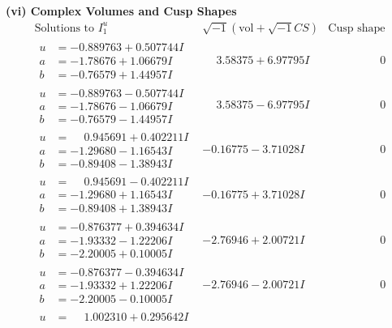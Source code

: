 \documentclass[1p]{elsarticle_modified}
\theoremstyle{definition}
\newcommand{\I}{\sqrt{-1}}
\begin{document}
\newpage\flushleft \textbf{(vi) Complex Volumes and Cusp Shapes}
$$\begin{array}{c|c|c}  
\text{Solutions to }I^u_{1}& \I (\text{vol} + \sqrt{-1}CS) & \text{Cusp shape}\\
 \hline 
\begin{aligned}
u &= -0.889763 + 0.507744 I \\
a &= -1.78676 + 1.06679 I \\
b &= -0.76579 + 1.44957 I\end{aligned}
 & \phantom{-}3.58375 + 6.97795 I & \phantom{-0.000000 } 0 \\ \hline\begin{aligned}
u &= -0.889763 - 0.507744 I \\
a &= -1.78676 - 1.06679 I \\
b &= -0.76579 - 1.44957 I\end{aligned}
 & \phantom{-}3.58375 - 6.97795 I & \phantom{-0.000000 } 0 \\ \hline\begin{aligned}
u &= \phantom{-}0.945691 + 0.402211 I \\
a &= -1.29680 - 1.16543 I \\
b &= -0.89408 - 1.38943 I\end{aligned}
 & -0.16775 - 3.71028 I & \phantom{-0.000000 } 0 \\ \hline\begin{aligned}
u &= \phantom{-}0.945691 - 0.402211 I \\
a &= -1.29680 + 1.16543 I \\
b &= -0.89408 + 1.38943 I\end{aligned}
 & -0.16775 + 3.71028 I & \phantom{-0.000000 } 0 \\ \hline\begin{aligned}
u &= -0.876377 + 0.394634 I \\
a &= -1.93332 - 1.22206 I \\
b &= -2.20005 + 0.10005 I\end{aligned}
 & -2.76946 + 2.00721 I & \phantom{-0.000000 } 0 \\ \hline\begin{aligned}
u &= -0.876377 - 0.394634 I \\
a &= -1.93332 + 1.22206 I \\
b &= -2.20005 - 0.10005 I\end{aligned}
 & -2.76946 - 2.00721 I & \phantom{-0.000000 } 0 \\ \hline\begin{aligned}
u &= \phantom{-}1.002310 + 0.295642 I \\

\end{aligned}
\end{array}$$
\end{document}
